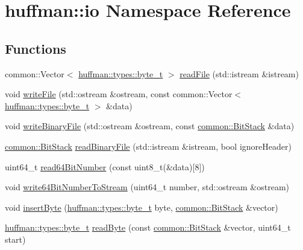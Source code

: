 \hypertarget{namespacehuffman_1_1io}{}\section{huffman\+:\+:io Namespace Reference}
\label{namespacehuffman_1_1io}
\subsection*{Functions}
\begin{DoxyCompactItemize}
\item 
common\+::\+Vector$<$ \hyperlink{namespacehuffman_1_1types_a198fb2bbef1012ab1696124836c56f0d}{huffman\+::types\+::byte\+\_\+t} $>$ \hyperlink{namespacehuffman_1_1io_a3dc9d3bd379dd95a993bff408092514a}{read\+File} (std\+::istream \&istream)
\item 
void \hyperlink{namespacehuffman_1_1io_a46774d6debc0d1318c44db613a700ab0}{write\+File} (std\+::ostream \&ostream, const common\+::\+Vector$<$ \hyperlink{namespacehuffman_1_1types_a198fb2bbef1012ab1696124836c56f0d}{huffman\+::types\+::byte\+\_\+t} $>$ \&data)
\item 
void \hyperlink{namespacehuffman_1_1io_a54d99edde92b3edabf312b6075a2e32e}{write\+Binary\+File} (std\+::ostream \&ostream, const \hyperlink{classcommon_1_1BitStack}{common\+::\+Bit\+Stack} \&data)
\item 
\hyperlink{classcommon_1_1BitStack}{common\+::\+Bit\+Stack} \hyperlink{namespacehuffman_1_1io_ada2a069d00c22f9fed6aab608d863276}{read\+Binary\+File} (std\+::istream \&istream, bool ignore\+Header)
\item 
uint64\+\_\+t \hyperlink{namespacehuffman_1_1io_a74c4d7967e01dff1bf9bc744be4caeb1}{read64\+Bit\+Number} (const uint8\+\_\+t(\&data)\mbox{[}8\mbox{]})
\item 
void \hyperlink{namespacehuffman_1_1io_ad2faf41d8e4c35955127f096b42f48e9}{write64\+Bit\+Number\+To\+Stream} (uint64\+\_\+t number, std\+::ostream \&ostream)
\item 
void \hyperlink{namespacehuffman_1_1io_ada1e15818c5ab806b890ad58a7c58270}{insert\+Byte} (\hyperlink{namespacehuffman_1_1types_a198fb2bbef1012ab1696124836c56f0d}{huffman\+::types\+::byte\+\_\+t} byte, \hyperlink{classcommon_1_1BitStack}{common\+::\+Bit\+Stack} \&vector)
\item 
\hyperlink{namespacehuffman_1_1types_a198fb2bbef1012ab1696124836c56f0d}{huffman\+::types\+::byte\+\_\+t} \hyperlink{namespacehuffman_1_1io_af34a00787e1294fb7b72c7d02d214875}{read\+Byte} (const \hyperlink{classcommon_1_1BitStack}{common\+::\+Bit\+Stack} \&vector, uint64\+\_\+t start)
\end{DoxyCompactItemize}


